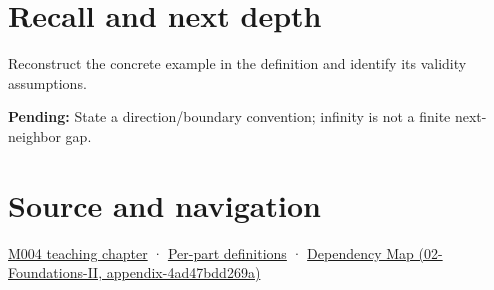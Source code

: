 \section{Recall and next depth}\label{appendix-14bab4cab9d4-recall-and-next-depth}

Reconstruct the concrete example in the definition and identify its validity assumptions.

\textbf{Pending:} State a direction/boundary convention; infinity is not a finite next-neighbor gap.

\section{Source and navigation}\label{appendix-14bab4cab9d4-source-and-navigation}

\href{Continuous\%20Notes/Computing\%20Foundations\%20-\%20From\%20Bits\%20to\%20C++\%20and\%20Systems\%20APIs\#A\%20stretching\%20ruler\%20for\%20real-valued\%20quantities}{M004 teaching chapter} · \hyperref[appendix-fd090d982a15-m004---parts-61-76]{Per-part definitions} · \href{../02-Foundations-II/main.pdf\#nameddest=appendix-4ad47bdd269a}{Dependency Map (02-Foundations-II, appendix-4ad47bdd269a)}
